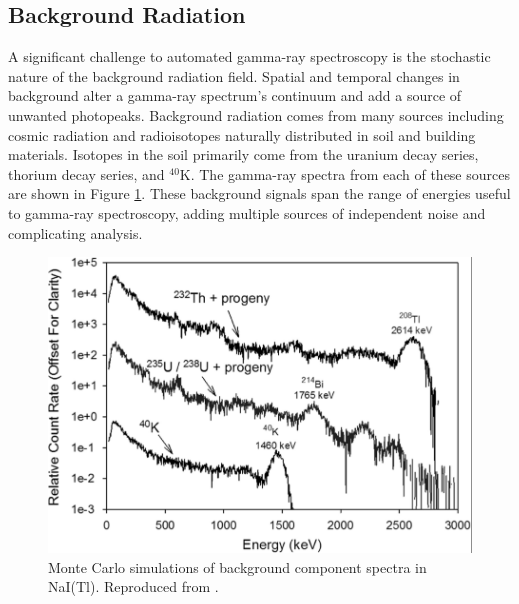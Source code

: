 \subsection{Background Radiation}


A significant challenge to automated gamma-ray spectroscopy is the stochastic nature of the background radiation field. 
Spatial and temporal changes in background alter a gamma-ray spectrum's continuum and add a source of unwanted photopeaks. Background radiation comes from many sources including cosmic radiation and radioisotopes naturally distributed in soil and building materials. Isotopes in the soil primarily come from the uranium decay series, thorium  decay series, and $^{40}$K. The gamma-ray spectra from each of these sources are shown in Figure \ref{fig:background_components}. These background signals span the range of energies useful to gamma-ray spectroscopy, adding multiple sources of independent noise and complicating analysis.

\begin{figure}[H]
\centering
\includegraphics[width=0.8\linewidth]{images/background_components}
\caption{Monte Carlo simulations of background component spectra in NaI(Tl). Reproduced from \cite{KULISEK2015}.}
\label{fig:background_components}
\end{figure}

